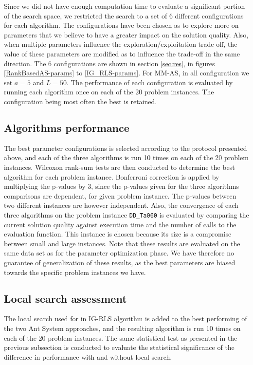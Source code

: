 \documentclass[runningheads]{llncs}
\begin{document}
Since we did not have enough computation time to evaluate a significant portion
of the search space, we restricted the search to a set of 6 different
configurations for each algorithm. The configurations have been chosen as to
explore more on parameters that we believe to have a greater impact on the
solution quality. Also, when multiple parameters influence the
exploration/exploitation trade-off, the value of these parameters are modified
as to influence the trade-off in the same direction. The 6 configurations are
shown in section \ref{sec:res}, in figures \ref{RankBasedAS-params} to
\ref{IG_RLS-params}. For MM-AS, in all configuration we set $a=5$ and $L=50$.
The performance of each configuration is evaluated by running each algorithm
once on each of the 20 problem instances. The configuration being most often the
best is retained.

\subsection{Algorithms performance}

The best parameter configurations is selected according to the protocol
presented above, and each of the three algorithms is run 10 times on each of the
20 problem instances. Wilcoxon rank-sum tests are then conducted to determine
the best algorithm for each problem instance. Bonferroni correction is applied
by multiplying the p-values by 3, since the p-values given for the three
algorithms comparisons are dependent, for  given problem instance. The p-values
between two different instances are however independent. Also, the convergence
of each three algorithms on the problem instance \texttt{DD\_Ta060} is evaluated
by comparing the current solution quality against execution time and the number
of calls to the evaluation function. This instance is chosen because its size is
a compromise between small and large instances. Note that these results are
evaluated on the same data set as for the parameter optimization phase. We have
therefore no guarantee of generalization of these results, as the best
parameters are biased towards the specific problem instances we have.

\subsection{Local search assessment}

The local search used for in IG-RLS algorithm is added to the best performing of
the two Ant System approaches, and the resulting algorithm is run 10 times on
each of the 20 problem instances. The same statistical test as presented in the
previous subsection is conducted to evaluate the statistical significance of the
difference in performance with and without local search.
\end{document}
